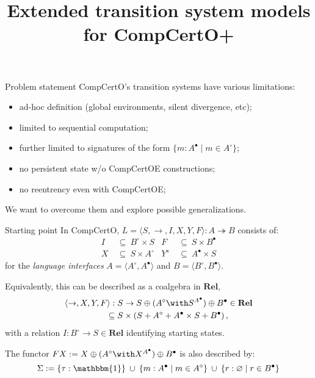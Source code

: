 \documentclass[mathserif]{beamer}
\title{Extended transition system models for CompCertO+}
\newcommand{\que}{\circ}
\newcommand{\ans}{\bullet}
\begin{document}
\maketitle

\begin{frame}{Problem statement}
  CompCertO's transition systems
  have various limitations:
  \begin{itemize}
    \item ad-hoc definition (global environments, silent divergence, etc);
    \item limited to sequential computation;
    \item further limited to signatures of the form $\{ m: A^\ans \mid m \in A^\que \}$;
    \item no persistent state w/o CompCertOE constructions;
    \item no reentrency even with CompCertOE;
  \end{itemize}

  \vspace{1em}
  We want to overcome them
  and explore possible generalizations.
\end{frame}

\begin{frame}{Starting point}
  In CompCertO,
  $L = \langle S, {\rightarrow}, I, X, Y, F \rangle : A \twoheadrightarrow B$
  consists of:
  \begin{align*}
    I &\:\subseteq\: B^\que \times S
    &
    F &\:\subseteq\: S \times B^\ans
    \\
    X &\:\subseteq\: S \times A^\que
    &
    Y^{s} &\:\subseteq\: A^\ans \times S
  \end{align*}
  for the \emph{language interfaces} $A = \langle A^\que, A^\ans \rangle$
  and $B = \langle B^\que, B^\ans \rangle$.

  \pause
  \vfill
  Equivalently, this can be described as a coalgebra in $\mathbf{Rel}$,
  \begin{align*}
    \langle {\rightarrow}, X, Y, F \rangle
      : {} &S \rightarrow S \oplus (A^\que \with S^{A^\ans}) \oplus B^\ans \in \mathbf{Rel} \\
      \subseteq {} & S \times
      (S + A^\que + {A^\ans} \times S + B^\ans)
    \,,
  \end{align*}
  with a relation $I : B^\que \rightarrow S \in \mathbf{Rel}$
  identifying starting states.

  \pause
  \vfill
  The functor $FX := X \oplus (A^\que \with X^{A^\ans}) \oplus B^\ans$
  is also described by:
  \[
    \Sigma :=
    \{ \tau : \mathbbm{1} \} \:\cup\:
    \{ m : A^\ans \mid m \in A^\que \} \:\cup\:
    \{ r : \varnothing \mid r \in B^\ans \}
  \]
\end{frame}
\end{document}
